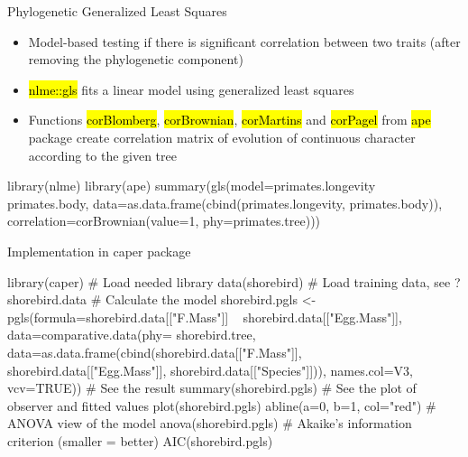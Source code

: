 \documentclass[compress, ucs, xelatex, 11pt, xcolor=svgnames,
  hyperref={
    bookmarks=true,
    unicode=true,
    colorlinks=true,
    pdftitle={Molecular data in R},
    plainpages=false,
    pdfauthor={Vojtech Zeisek},
    pdfsubject={Course about phylogeny and evolution in R},
    pdfcreator={XeLaTeX},
    pdfkeywords={R, evolution, phylogeny, molecular data},
    linkcolor=Tomato,
    anchorcolor=SaddleBrown,
    citecolor=Goldenrod,
    filecolor=DarkMagenta,
    menucolor=Sienna,
    urlcolor=DarkTurquoise,
    pdftex},
  url={hyphens, lowtilde} %
  ]{beamer}
\renewcommand{\texttt}[1]{\hl{\ttfamily #1}}
\begin{document}
\begin{frame}[fragile]{Phylogenetic Generalized Least Squares}
  \begin{itemize}
    \item Model-based testing if there is significant correlation between two traits (after removing the phylogenetic component)
    \item \texttt{nlme::gls} fits a linear model using generalized least squares
    \item Functions \texttt{corBlomberg}, \texttt{corBrownian}, \texttt{corMartins} and \texttt{corPagel} from \texttt{ape} package create correlation matrix of evolution of continuous character according to the given tree
  \end{itemize}
  \begin{spluscode}
    library(nlme)
    library(ape)
    summary(gls(model=primates.longevity ~ primates.body,
      data=as.data.frame(cbind(primates.longevity, primates.body)),
      correlation=corBrownian(value=1, phy=primates.tree)))
  \end{spluscode}
\end{frame}

\begin{frame}[fragile]{Implementation in caper package}
  \begin{spluscode}
    library(caper) # Load needed library
    data(shorebird) # Load training data, see ?shorebird.data
    # Calculate the model
    shorebird.pgls <- pgls(formula=shorebird.data[["F.Mass"]] ~
      shorebird.data[["Egg.Mass"]], data=comparative.data(phy=
      shorebird.tree, data=as.data.frame(cbind(shorebird.data[["F.Mass"]],
      shorebird.data[["Egg.Mass"]], shorebird.data[["Species"]])),
      names.col=V3, vcv=TRUE))
    # See the result
    summary(shorebird.pgls)
    # See the plot of observer and fitted values
    plot(shorebird.pgls)
    abline(a=0, b=1, col="red")
    # ANOVA view of the model
    anova(shorebird.pgls)
    # Akaike's information criterion (smaller = better)
    AIC(shorebird.pgls)
  \end{spluscode}
\end{frame}
\end{document}
